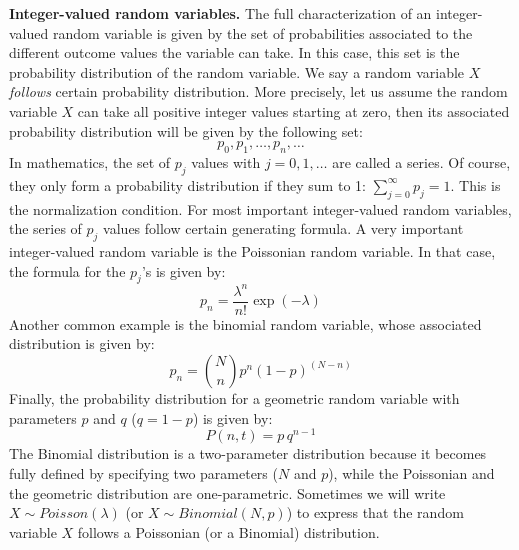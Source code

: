\documentclass{article}
\begin{document}
{\bf Integer-valued random variables.} The full characterization of an integer-valued random variable is given by the set of probabilities associated to the different outcome values the variable can take. In this case, this set is the probability distribution of the random variable. We say a random variable $X$ {\it follows} certain probability distribution. More precisely, let us assume the random variable $X$ can take all positive integer values starting at zero, then its associated probability distribution will be given by the following set: 
\begin{equation}
p_0, p_1, \dots, p_n, \dots
\end{equation}
In mathematics, the set of $p_j$ values with $j=0,1,\dots$ are called a series. Of course, they only form a probability distribution if they sum to 1: $\sum_{j=0}^{\infty} p_j = 1$. This is the normalization condition. For most important integer-valued random variables, the series of $p_j$ values follow certain generating formula. A very important integer-valued random variable is the Poissonian random variable. In that case, the formula for the $p_j$'s is given by:
\begin{equation}
    p_n = \frac{\lambda^n}{n!} \exp(-\lambda)
\end{equation}
Another common example is the binomial random variable, whose associated distribution is given by:
\begin{equation}
    p_n = \binom{N}{n} p^n (1-p)^{(N-n)}
\end{equation}
Finally, the probability distribution for a geometric random variable with parameters $p$ and $q$ ($q = 1-p$) is given by:
\begin{equation}
    P(n,t) = p\,q^{n-1}
\end{equation}
The Binomial distribution is a two-parameter distribution because it becomes fully defined by specifying two parameters ($N$ and $p$), while the Poissonian and the geometric distribution are one-parametric. Sometimes we will write $X \sim Poisson(\lambda)$ (or $X \sim Binomial(N,p)$) to express that the random variable $X$ follows a Poissonian (or a Binomial) distribution. 
\smallskip
\end{document}
